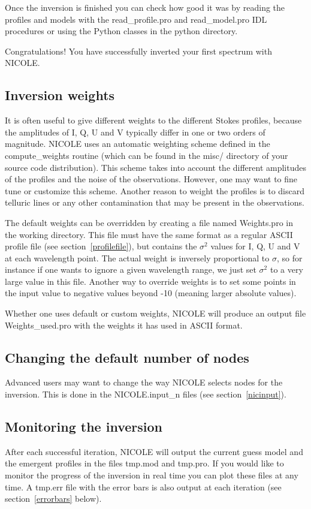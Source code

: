 Once the inversion is finished you can check how good it was by
reading the profiles and models with the read\_profile.pro and
read\_model.pro IDL procedures or using the Python classes in the
python directory.

Congratulations! You have successfully inverted your first spectrum
with NICOLE.

\subsection{Inversion weights}

It is often useful to give different weights to the different Stokes
profiles, because the amplitudes of I, Q, U and V typically differ in
one or two orders of magnitude. NICOLE uses an automatic weighting
scheme defined in the compute\_weights routine (which can be found in
the misc/ directory of your source code distribution). This scheme
takes into account the different amplitudes of the profiles and the
noise of the observations. However, one may want to fine tune or
customize this scheme. Another reason to weight the profiles is to
discard telluric lines or any other contamination that may be present
in the observations.

The default weights can be overridden by creating a file named
Weights.pro in the working directory. This file must have the same
format as a regular ASCII profile file (see
section~\ref{profilefile}), but contains the $\sigma^2$ values for I,
Q, U and V at each wavelength point. The actual weight is inversely
proportional to $\sigma$, so for instance if one wants to ignore a
given wavelength range, we just set $\sigma^2$ to a very large value
in this file. Another way to override weights is to set some points in
the input value to negative values beyond -10 (meaning larger absolute
values). 

Whether one uses default or custom weights, NICOLE will produce an
output file Weights\_used.pro with the weights it has used in ASCII
format.


\subsection{Changing the default number of nodes}

Advanced users may want to change the way NICOLE selects nodes for the
inversion. This is done in the NICOLE.input\_n files (see section~\ref{nicinput}). 


\subsection{Monitoring the inversion}
After each successful iteration, NICOLE will output the current guess 
model and the emergent profiles in the files tmp.mod and tmp.pro. 
If you would like to monitor the progress of the
inversion in real time you can plot these files at any time.
A tmp.err file with the error bars is also output at each iteration
(see section~\ref{errorbars} below).


